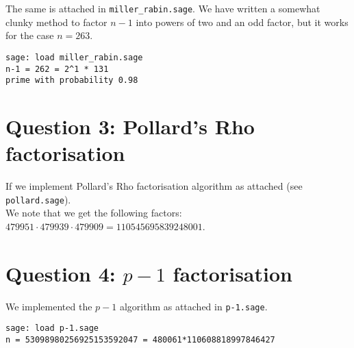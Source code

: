 \documentclass{article}
\begin{document}
The same is attached in \verb|miller_rabin.sage|.
We have written a somewhat clunky method to factor $n-1$ into powers of two and an odd factor, but it works for the case $n=263$.

\begin{verbatim}
sage: load miller_rabin.sage
n-1 = 262 = 2^1 * 131 
prime with probability 0.98
\end{verbatim}

\section{Question 3: Pollard's Rho factorisation}

If we implement Pollard's Rho factorisation algorithm as attached (see \verb|pollard.sage|). \\
\noindent
We note that we get the following factors: $479951 \cdot 479939 \cdot 479909 = 110545695839248001$.



\section{Question 4: $p - 1$ factorisation}
We implemented the $p-1$ algorithm as attached in \verb|p-1.sage|.
\begin{verbatim}
sage: load p-1.sage
n = 53098980256925153592047 = 480061*110608818997846427
\end{verbatim}
\end{document}
